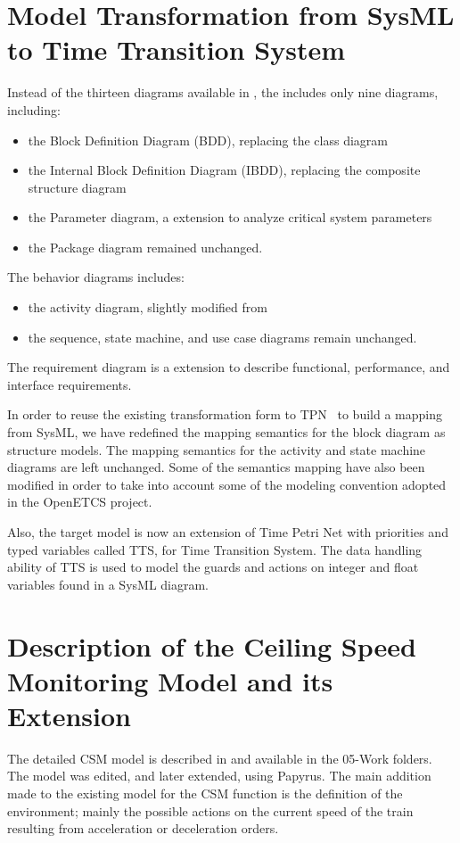 \section{Model Transformation from SysML to Time Transition System}
\label{sec:sysml}

Instead of the thirteen diagrams available in , the \sysml
includes only nine diagrams, including:
\begin{itemize}
\item
the Block Definition Diagram (BDD), replacing the  class diagram
\item
the Internal Block Definition Diagram (IBDD), replacing the  composite structure diagram
\item
the Parameter diagram, a \sysml extension to analyze critical system parameters
\item
the Package diagram remained unchanged. 
\end{itemize}

The behavior diagrams includes:
\begin{itemize}
\item
the activity diagram, slightly modified from 
\item
the sequence, state machine, and use case diagrams remain unchanged. 
\end{itemize}

The requirement diagram is a \sysml extension to describe functional, performance, and interface requirements.	

In order to reuse the existing transformation form \uml to
TPN~\cite{Ge2014} to build a mapping from SysML, we have redefined the
mapping semantics for the block diagram as structure models. The
mapping semantics for the activity and state machine diagrams are left
unchanged. Some of the semantics mapping have also been modified in
order to take into account some of the modeling convention adopted in
the OpenETCS project.

Also, the target model is now an extension of Time Petri Net with
priorities and typed variables called TTS, for Time Transition
System. The data handling ability of TTS is used to model the guards
and actions on integer and float variables found in a SysML diagram.


\section{Description of the Ceiling Speed Monitoring Model  and its Extension}
\label{sec:csm}
The detailed CSM \sysml model is described in \cite{csmwp4} and
available in the 05-Work folders. The model was edited, and later
extended, using Papyrus. The main addition made to the existing model
for the CSM function is the definition of the environment; mainly the
possible actions on the current speed of the train resulting from 
acceleration or deceleration orders. 

